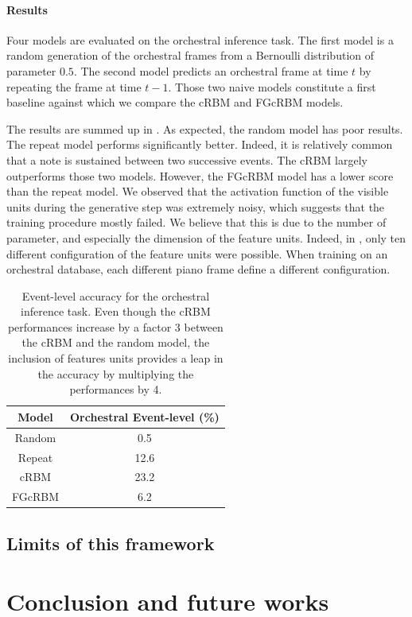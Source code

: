 \documentclass[twoside,twocolumn]{article}
\begin{document}
\paragraph{Results}
Four models are evaluated on the orchestral inference task. The first model is a random generation of the orchestral frames from a Bernoulli distribution of parameter $0.5$. The second model predicts an orchestral frame at time $t$ by repeating the frame at time $t-1$. Those two naive models constitute a first baseline against which we compare the cRBM and FGcRBM models.

The results are summed up in . As expected, the random model has poor results. The repeat model performs significantly better. Indeed, it is relatively common that a note is sustained between two successive events. The cRBM largely outperforms those two models. However, the FGcRBM model has a lower score than the repeat model. We observed that the activation function of the visible units during the generative step was extremely noisy, which suggests that the training procedure mostly failed. We believe that this is due to the number of parameter,  and especially the dimension of the feature units. Indeed, in \cite{taylor2009factored}, only ten different configuration of the feature units were possible. When training on an orchestral database,  each different piano frame define a different configuration.

\begin{table}[h]
\centering
\begin{tabular}{c c}
\hline
Model & Orchestral Event-level (\%)\\
\hline
Random & 0.5\\ 
Repeat & 12.6\\
\hline \hline
cRBM & 23.2\\ 
FGcRBM & 6.2\\ 
\end{tabular}
\caption{Event-level accuracy for the orchestral inference task. Even though the cRBM performances increase by a factor 3 between the cRBM and the random model, the inclusion of features units provides a leap in the accuracy by multiplying the performances by 4.}
\label{tab:result_event_level}
\end{table}

\subsection{Limits of this framework}

\section{Conclusion and future works}




\end{document}
